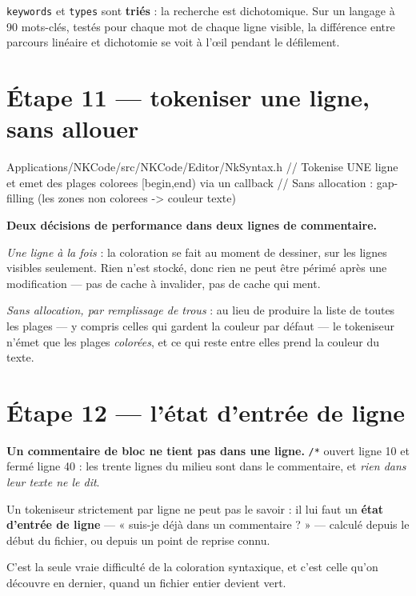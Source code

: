 \begin{nkretenir}
\texttt{keywords} et \texttt{types} sont \textbf{triés} : la recherche est
dichotomique. Sur un langage à 90 mots-clés, testés pour chaque mot de chaque
ligne visible, la différence entre parcours linéaire et dichotomie se voit à
l'\oe il pendant le défilement.
\end{nkretenir}

\section{Étape 11 --- tokeniser une ligne, sans allouer}

\begin{nkcode}{Applications/NKCode/src/NKCode/Editor/NkSyntax.h}
// Tokenise UNE ligne et emet des plages colorees [begin,end) via un callback
// Sans allocation : gap-filling (les zones non colorees -> couleur texte)
\end{nkcode}

\begin{nkretenir}
\textbf{Deux décisions de performance dans deux lignes de commentaire.}

\emph{Une ligne à la fois} : la coloration se fait au moment de dessiner, sur les
lignes visibles seulement. Rien n'est stocké, donc rien ne peut être périmé après
une modification --- pas de cache à invalider, pas de cache qui ment.

\emph{Sans allocation, par remplissage de trous} : au lieu de produire la liste
de toutes les plages --- y compris celles qui gardent la couleur par défaut ---
le tokeniseur n'émet que les plages \emph{colorées}, et ce qui reste entre elles
prend la couleur du texte.
\end{nkretenir}

\section{Étape 12 --- l'état d'entrée de ligne}

\begin{nkpiege}
\textbf{Un commentaire de bloc ne tient pas dans une ligne.} \texttt{/*} ouvert
ligne 10 et fermé ligne 40 : les trente lignes du milieu sont dans le
commentaire, et \emph{rien dans leur texte ne le dit}.

Un tokeniseur strictement par ligne ne peut pas le savoir : il lui faut un
\textbf{état d'entrée de ligne} --- « suis-je déjà dans un commentaire ? » ---
calculé depuis le début du fichier, ou depuis un point de reprise connu.

C'est la seule vraie difficulté de la coloration syntaxique, et c'est celle qu'on
découvre en dernier, quand un fichier entier devient vert.
\end{nkpiege}


